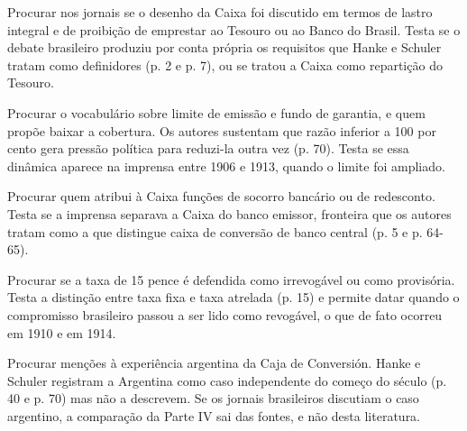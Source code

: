 \begin{dialogo}
\item Procurar nos jornais se o desenho da Caixa foi discutido em termos de
lastro integral e de proibição de emprestar ao Tesouro ou ao Banco do Brasil.
Testa se o debate brasileiro produziu por conta própria os requisitos que
Hanke e Schuler tratam como definidores (p. 2 e p. 7), ou se tratou a Caixa
como repartição do Tesouro.
\item Procurar o vocabulário sobre limite de emissão e fundo de garantia, e
quem propõe baixar a cobertura. Os autores sustentam que razão inferior a 100
por cento gera pressão política para reduzi-la outra vez (p. 70). Testa se essa
dinâmica aparece na imprensa entre 1906 e 1913, quando o limite foi ampliado.
\item Procurar quem atribui à Caixa funções de socorro bancário ou de
redesconto. Testa se a imprensa separava a Caixa do banco emissor, fronteira
que os autores tratam como a que distingue caixa de conversão de banco central
(p. 5 e p. 64-65).
\item Procurar se a taxa de 15 pence é defendida como irrevogável ou como
provisória. Testa a distinção entre taxa fixa e taxa atrelada (p. 15) e permite
datar quando o compromisso brasileiro passou a ser lido como revogável, o que
de fato ocorreu em 1910 e em 1914.
\item Procurar menções à experiência argentina da Caja de Conversión. Hanke e
Schuler registram a Argentina como caso independente do começo do século
(p. 40 e p. 70) mas não a descrevem. Se os jornais brasileiros discutiam o caso
argentino, a comparação da Parte IV sai das fontes, e não desta literatura.
\end{dialogo}


